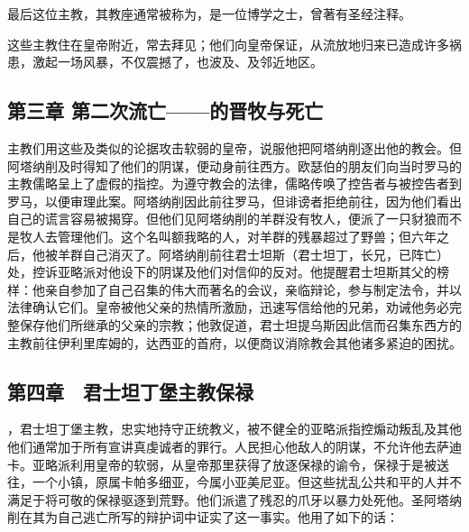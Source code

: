 最后这位主教，其教座通常被称为，是一位博学之士，曾著有圣经注释。\par

这些主教住在皇帝附近，常去拜见；他们向皇帝保证，从流放地归来已造成许多祸患，激起一场风暴，不仅震撼了，也波及、及邻近地区。\par


\subsection{第三章 第二次流亡——的晋牧与死亡}

主教们用这些及类似的论据攻击软弱的皇帝，说服他把阿塔纳削逐出他的教会。但阿塔纳削及时得知了他们的阴谋，便动身前往西方。欧瑟伯的朋友们向当时罗马的主教儒略呈上了虚假的指控。为遵守教会的法律，儒略传唤了控告者与被控告者到罗马，以便审理此案。阿塔纳削因此前往罗马，但诽谤者拒绝前往，因为他们看出自己的谎言容易被揭穿。但他们见阿塔纳削的羊群没有牧人，便派了一只豺狼而不是牧人去管理他们。这个名叫额我略的人，对羊群的残暴超过了野兽；但六年之后，他被羊群自己消灭了。阿塔纳削前往君士坦斯（君士坦丁，长兄，已阵亡）处，控诉亚略派对他设下的阴谋及他们对信仰的反对。他提醒君士坦斯其父的榜样：他亲自参加了自己召集的伟大而著名的会议，亲临辩论，参与制定法令，并以法律确认它们。皇帝被他父亲的热情所激励，迅速写信给他的兄弟，劝诫他务必完整保存他们所继承的父亲的宗教；他敦促道，君士坦提乌斯因此信而召集东西方的主教前往伊利里库姆的，达西亚的首府，以便商议消除教会其他诸多紧迫的困扰。\par


\subsection{第四章　君士坦丁堡主教保禄}

，君士坦丁堡主教，忠实地持守正统教义，被不健全的亚略派指控煽动叛乱及其他他们通常加于所有宣讲真虔诚者的罪行。人民担心他敌人的阴谋，不允许他去萨迪卡。亚略派利用皇帝的软弱，从皇帝那里获得了放逐保禄的谕令，保禄于是被送往，一个小镇，原属卡帕多细亚，今属小亚美尼亚。但这些扰乱公共和平的人并不满足于将可敬的保禄驱逐到荒野。他们派遣了残忍的爪牙以暴力处死他。圣阿塔纳削在其为自己逃亡所写的辩护词中证实了这一事实。他用了如下的话：\par

